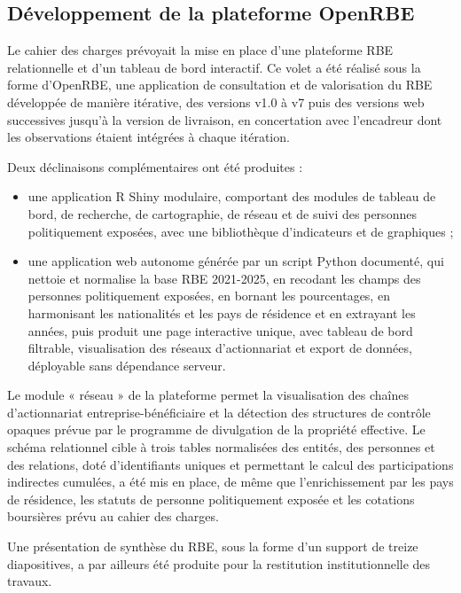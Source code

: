 \documentclass[12pt, a4paper]{article}
\begin{document}
\subsection{Développement de la plateforme OpenRBE}

Le cahier des charges prévoyait la mise en place d'une plateforme RBE
relationnelle et d'un tableau de bord interactif. Ce volet a été réalisé sous
la forme d'OpenRBE, une application de consultation et de valorisation
du RBE développée de manière itérative, des versions v1.0 à v7 puis des
versions web successives jusqu'à la version de livraison, en concertation avec
l'encadreur dont les
observations étaient intégrées à chaque itération.

Deux déclinaisons complémentaires ont été produites :

\begin{itemize}
  \item une application R Shiny modulaire, comportant des modules de tableau
  de bord, de recherche, de cartographie, de réseau et de suivi des personnes
  politiquement exposées, avec une bibliothèque d'indicateurs et de
  graphiques ;
  \item une application web autonome générée par un script Python documenté,
  qui nettoie et normalise la base RBE 2021-2025, en recodant les champs des
  personnes politiquement exposées, en bornant les pourcentages, en
  harmonisant les nationalités et les pays de résidence et en extrayant les
  années, puis produit une page interactive unique, avec tableau de bord
  filtrable, visualisation des réseaux d'actionnariat et export de données,
  déployable sans dépendance serveur.
\end{itemize}

Le module « réseau » de la plateforme permet la visualisation des chaînes
d'actionnariat entreprise-bénéficiaire et la détection des structures de
contrôle opaques prévue par le programme de divulgation de la propriété
effective. Le schéma relationnel cible à trois tables normalisées des entités,
des personnes et des relations, doté d'identifiants uniques et permettant le
calcul des participations indirectes cumulées, a été mis en place, de même que
l'enrichissement par les pays de résidence, les statuts de personne
politiquement exposée et les cotations boursières prévu au cahier des charges.

Une présentation de synthèse du RBE, sous la forme d'un support de treize
diapositives, a par ailleurs été produite pour la restitution institutionnelle des travaux.
\end{document}
